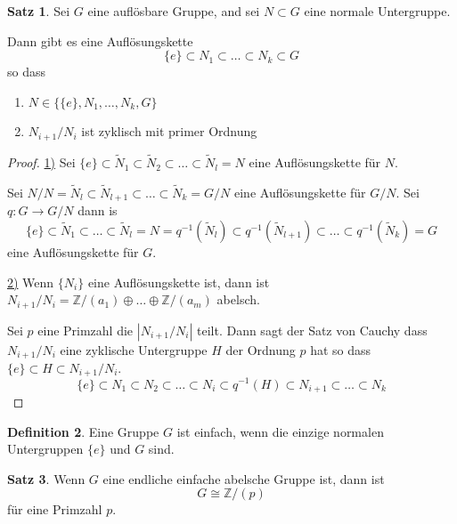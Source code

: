 \documentclass[12pt,parskip=full]{scrartcl}
\newcommand{\setZ}{\mathbb{Z}}
\newcommand{\abs}[1]{{\left| #1 \right|}}
\newcommand{\heading}{\underline}
\theoremstyle{definition}
\newtheorem{theorem}{Satz}[section]
\newtheorem{definition}[theorem]{Definition}
\theoremstyle{remark}
\begin{document}
	\begin{theorem}
		Sei $G$ eine auflösbare Gruppe, and sei $N \subset G$ eine normale Untergruppe.
		
		Dann gibt es eine Auflösungskette
		\begin{equation*}
			\{ e \} \subset N_1 \subset \dots \subset N_k \subset G
		\end{equation*}
		so dass
		\begin{enumerate}
			\item $N \in \{ \{e\}, N_1, \dots, N_k, G \}$
			\item $N_{i+1}/N_i$ ist zyklisch mit primer Ordnung
		\end{enumerate}
	\end{theorem}

	\begin{proof}
		\heading{1)} Sei $\{ e \}  \subset \tilde{N}_1 \subset \tilde{N}_2 \subset \dots \subset \tilde{N}_l = N$ eine Auflösungskette für $N$.
		
		Sei $N/N = \tilde{N}_{l} \subset \tilde{N}_{l+1} \subset \dots \subset \tilde{N}_k = G/N$ eine Auflösungskette für $G/N$. Sei $q: G \to G/N$ dann is
		\begin{equation*}
			\{ e \} \subset \tilde{N}_1 \subset \dots \subset \tilde{N}_l = N = q^{-1}(\tilde{N}_l) \subset q^{-1}(\tilde{N}_{l+1}) \subset \dots \subset q^{-1}(\tilde{N}_k) = G
		\end{equation*}
		eine Auflösungskette für $G$.
		
		\heading{2)} Wenn $\{ N_i \}$ eine Auflösungskette ist, dann ist $N_{i+1}/N_i = \setZ/(a_1) \oplus \dots \oplus \setZ/(a_m)$ abelsch.
		
		Sei $p$ eine Primzahl die $\abs{N_{i+1}/N_i}$ teilt. Dann sagt der Satz von Cauchy dass $N_{i+1} / N_i$ eine zyklische Untergruppe $H$ der Ordnung $p$ hat so dass $\{ e \} \subset H \subset N_{i+1}/N_i$.
		\begin{equation*}
			\{ e \} \subset N_1 \subset N_2 \subset \dots \subset N_i \subset q^{-1}(H) \subset N_{i+1} \subset \dots \subset N_k
		\end{equation*}
	\end{proof}

	\begin{definition}
		Eine Gruppe $G$ ist einfach, wenn die einzige normalen Untergruppen $\{ e \}$ und $G$ sind.
	\end{definition}

	\begin{theorem}
		Wenn $G$ eine endliche einfache abelsche Gruppe ist, dann ist
		\begin{equation*}
			G \cong \setZ/(p)
		\end{equation*}
		für eine Primzahl $p$.
	\end{theorem}
\end{document}
